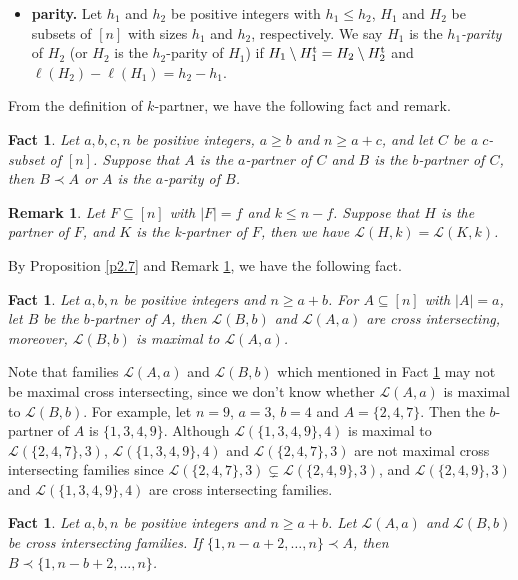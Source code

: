 \documentclass[a4paper,11pt]{article}
\newtheorem{fact}[theorem]{Fact}
\newtheorem{remark}[theorem]{Remark}
\begin{document}
\begin{itemize}
\item {\bf parity.}
Let $h_1$ and $h_2$ be positive integers with $h_1\leq h_2$, $H_1$ and $H_2$ be subsets of $[n]$ with sizes $h_1$ and $h_2$, respectively. We say $H_1$ is the {\it $h_1$-parity} of $H_2$ (or $H_2$ is the $h_2$-parity of $H_1$) if $H_1\setminus H_1^{\rm t}=H_2\setminus H_2^{\rm t}$ and $\ell(H_2)-\ell(H_1)=h_2-h_1$.
\end{itemize}

From the definition of $k$-partner, we have the following fact and remark.

\begin{fact}\label{f2.11}
Let $a, b, c, n$ be positive integers, $a\geq b$ and $n\geq a+c$, and let $C$ be a $c$-subset of $[n]$. Suppose that $A$ is the $a$-partner of $C$ and $B$ is the $b$-partner of $C$, then $B\prec A$ or $A$ is the $a$-parity of $B$.
\end{fact}



\begin{remark}\label{r2.6}
Let $F\subseteq [n]$ with $|F|=f$ and $k\leq n-f$. Suppose that  $H$ is the partner of $F$, and $K$ is the k-partner of $F$, then we have $\mathcal{L}(H, k)=\mathcal{L}(K, k)$.
\end{remark}

By Proposition \ref{p2.7} and Remark \ref{r2.6}, we have the following fact.
\begin{fact}\label{f2.8}
Let $a, b, n$ be positive integers and $n\geq a+b$. For  $A\subseteq [n]$ with $|A|=a$, let $B$ be the $b$-partner of $A$, then
 $\mathcal{L}(B, b)$ and $\mathcal{L}(A, a)$ are cross intersecting, moreover,
  $\mathcal{L}(B, b)$ is maximal to $\mathcal{L}(A, a)$.
\end{fact}


Note that  families $\mathcal{L}(A, a)$ and $\mathcal{L}(B, b)$ which mentioned in Fact \ref{f2.8} may not be maximal cross intersecting, since we don't know whether $\mathcal{L}(A, a)$ is maximal to $\mathcal{L}(B, b)$. For example, let $n=9$, $a=3$, $b=4$ and $A=\{2, 4, 7\}$. Then the $b$-partner of $A$ is $\{1, 3, 4, 9\}$. Although $\mathcal{L}(\{1, 3, 4, 9\}, 4)$ is maximal to $\mathcal{L}(\{2, 4, 7\}, 3)$, $\mathcal{L}(\{1, 3, 4, 9\}, 4)$ and $\mathcal{L}(\{2, 4, 7\}, 3)$ are not maximal cross intersecting families since $\mathcal{L}(\{2, 4, 7\}, 3)\subsetneq\mathcal{L}(\{2, 4, 9\}, 3)$, and $\mathcal{L}(\{2, 4, 9\}, 3)$ and $\mathcal{L}(\{1, 3, 4, 9\}, 4)$ are cross intersecting families.
\begin{fact}\label{7-21-2}
Let $a, b, n$ be positive integers and $n\geq a+b$.
Let $\mathcal{L}(A, a)$ and $\mathcal{L}(B, b)$ be cross intersecting families.
If $\{1, n-a+2, \dots, n\}\prec A$, then $B\prec \{1, n-b+2, \dots, n\}$.
\end{fact}
\end{document}
